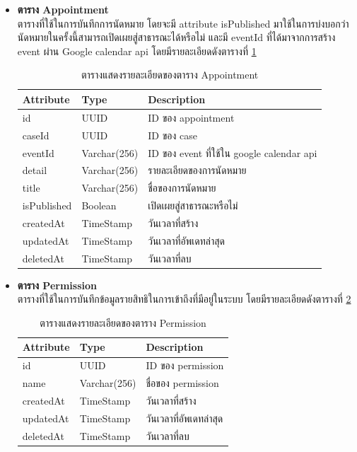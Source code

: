 \documentclass[12pt,oneside,openright,a4paper]{cpe-thai-project}
\begin{document}
\begin{itemize}
\item \textbf{ตาราง Appointment}\\
ตารางที่ใช้ในการบันทึกการนัดหมาย โดยจะมี attribute isPublished มาใช้ในการบ่งบอกว่า นัดหมายในครั้งนี้สามารถเปิดเผยสู่สาธารณะได้หรือไม่ และมี eventId ที่ได้มาจากการสร้าง event ผ่าน Google calendar api โดยมีรายละเอียดดังตารางที่  \ref{tbl:dbAppointment}
\begin{table}[!ht]
    \centering
    \begin{tabular}{|p{4cm}|p{2cm}|p{6cm}|}
    \hline
    \textbf{Attribute} & \textbf{Type} & \textbf{Description}   \\ \hline
    id          & UUID        & ID ของ appointment                        \\ \hline
    caseId      & UUID        & ID ของ case                               \\ \hline
    eventId     & Varchar(256) & ID ของ event ที่ใช้ใน google calendar api \\ \hline
    detail      & Varchar(256) & รายละเอียดของการนัดหมาย                   \\ \hline
    title       & Varchar(256) & ชื่อของการนัดหมาย                         \\ \hline
    isPublished & Boolean        & เปิดเผยสู่สาธารณะหรือไม่                  \\ \hline
    createdAt   & TimeStamp   & วันเวลาที่สร้าง                           \\ \hline
    updatedAt   & TimeStamp   & วันเวลาที่อัพเดทล่าสุด                    \\ \hline
    deletedAt   & TimeStamp   & วันเวลาที่ลบ             \\ \hline
    \end{tabular}
    \caption{\centering  ตารางแสดงรายละเอียดของตาราง Appointment} \label{tbl:dbAppointment}
\end{table}

\newpage
\item \textbf{ตาราง Permission}\\
ตารางที่ใช้ในการบันทึกข้อมูลรายสิทธิในการเข้าถึงที่มีอยู่ในระบบ โดยมีรายละเอียดดังตารางที่ \ref{tbl:dbPermission}
\begin{table}[!ht]
    \centering
    \begin{tabular}{|p{4cm}|p{2cm}|p{6cm}|}
    \hline
    \textbf{Attribute} & \textbf{Type} & \textbf{Description}   \\ \hline
    id        & UUID        & ID ของ permission      \\ \hline
    name      & Varchar(256) & ชื่อของ permission     \\ \hline
    createdAt & TimeStamp   & วันเวลาที่สร้าง        \\ \hline
    updatedAt & TimeStamp   & วันเวลาที่อัพเดทล่าสุด \\ \hline
    deletedAt & TimeStamp   & วันเวลาที่ลบ                \\ \hline
    \end{tabular}
    \caption{\centering  ตารางแสดงรายละเอียดของตาราง Permission} \label{tbl:dbPermission}
\end{table}


\end{itemize}
\end{document}
